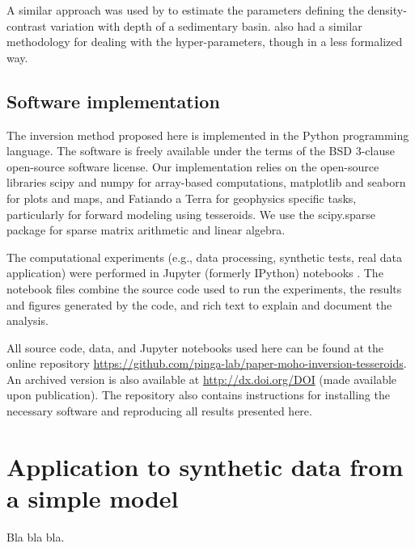 \documentclass[extra,mreferee]{gji}
\begin{document}
A similar approach was used by \citet{martins2010}
to estimate the parameters defining
the density-contrast variation with depth
of a sedimentary basin.
\citet{vandermeijde2013} also had
a similar methodology for dealing with the hyper-parameters,
though in a less formalized way.



\subsection{Software implementation}

The inversion method proposed here is implemented in the Python programming
language.
The software is freely available
under the terms of the BSD 3-clause open-source software license.
Our implementation relies on the open-source libraries
scipy and numpy \citep[][ \url{http://scipy.org}]{jones2001}
for array-based computations,
matplotlib \citep[][ \url{http://matplotlib.org}]{hunter2007}
and seaborn
\citep[][ \url{http://stanford.edu/~mwaskom/software/seaborn}]{waskom2015}
for plots and maps,
and Fatiando a Terra \citep[][ \url{http://www.fatiando.org}]{uieda2013}
for geophysics specific tasks,
particularly for forward modeling using tesseroids.
We use the scipy.sparse package for sparse matrix arithmetic and linear
algebra.

The computational experiments
(e.g., data processing, synthetic tests, real data application)
were performed in
Jupyter (formerly IPython) notebooks
\citep[][ \url{http://jupyter.org/}]{perez2007}.
The notebook files combine the source code used to run the experiments,
the results and figures generated by the code,
and rich text to explain and document the analysis.

All source code, data, and Jupyter notebooks
used here can be found at the online repository
\url{https://github.com/pinga-lab/paper-moho-inversion-tesseroids}.
An archived version is also available at
\url{http://dx.doi.org/DOI} (made available upon publication).
The repository also contains instructions for installing the necessary software
and reproducing all results presented here.


\section{Application to synthetic data from a simple model}

Bla bla bla.
\end{document}
